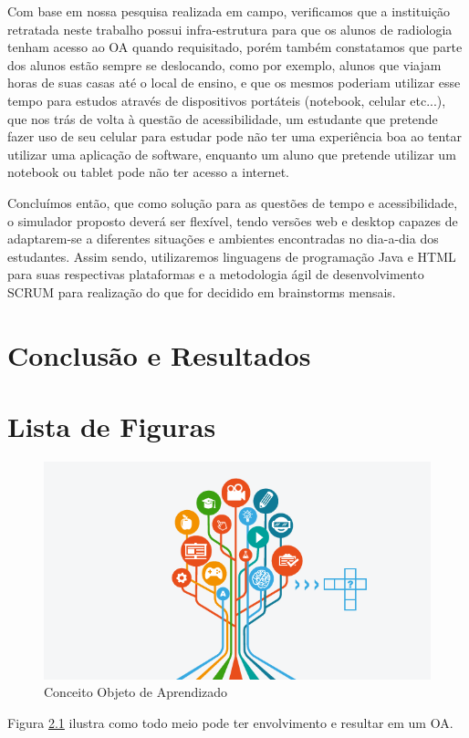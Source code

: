 \documentclass[12pt,openright,oneside,a4paper,english,french,spanish,brazil]{unifil}
\begin{document}
Com base em nossa pesquisa realizada em campo, verificamos que a instituição retratada neste trabalho possui infra-estrutura para que os alunos de radiologia tenham acesso ao OA quando requisitado, porém também constatamos que parte dos alunos estão sempre se deslocando, como por exemplo, alunos que viajam horas de suas casas até o local de ensino, e que os mesmos poderiam utilizar esse tempo para estudos através de dispositivos portáteis (notebook, celular etc...), que nos trás de volta à questão de acessibilidade, um estudante que pretende fazer uso de seu celular para estudar pode não ter uma experiência boa ao tentar utilizar uma aplicação de software, enquanto um aluno que pretende utilizar um notebook ou tablet pode não ter acesso a internet.

Concluímos então, que como solução para as questões de tempo e acessibilidade, o simulador proposto deverá ser flexível, tendo versões web e desktop capazes de adaptarem-se a diferentes situações e ambientes encontradas no dia-a-dia dos estudantes. Assim sendo, utilizaremos linguagens de programação Java e HTML para suas respectivas plataformas e a metodologia ágil de desenvolvimento SCRUM para realização do que for decidido em brainstorms mensais.


\chapter {Conclusão e Resultados}

\chapter{Lista de Figuras}

\begin{figure}[htb]
	\centering
	\includegraphics[scale=0.5]{images/arvore.png}
	\caption{Conceito Objeto de Aprendizado}
	\label{img:arvore}
\end{figure}
Figura \ref{img:arvore} ilustra como todo meio pode ter envolvimento e resultar em um OA.
\end{document}
